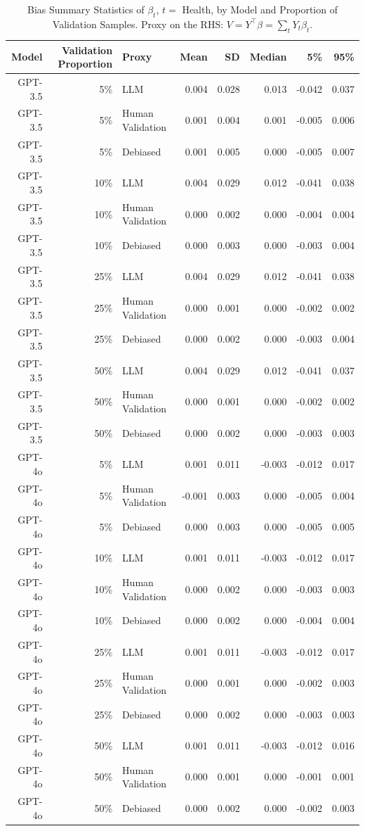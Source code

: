 \begin{table}

\caption{\label{tab:unnamed-chunk-1}Bias Summary Statistics of $\beta_{t}$, $t=$ Health, by Model and Proportion of Validation Samples.
      Proxy on the RHS: $V = Y^\top \beta = \sum_{t} Y_t \beta_t$.}
\centering
\begin{tabular}[t]{rrlrrrrr}
\toprule
Model & Validation Proportion & Proxy & Mean & SD & Median & 5\% & 95\%\\
\midrule
GPT-3.5 & 5\% & LLM & 0.004 & 0.028 & 0.013 & -0.042 & 0.037\\
GPT-3.5 & 5\% & Human Validation & 0.001 & 0.004 & 0.001 & -0.005 & 0.006\\
GPT-3.5 & 5\% & Debiased & 0.001 & 0.005 & 0.000 & -0.005 & 0.007\\
GPT-3.5 & 10\% & LLM & 0.004 & 0.029 & 0.012 & -0.041 & 0.038\\
GPT-3.5 & 10\% & Human Validation & 0.000 & 0.002 & 0.000 & -0.004 & 0.004\\
GPT-3.5 & 10\% & Debiased & 0.000 & 0.003 & 0.000 & -0.003 & 0.004\\
GPT-3.5 & 25\% & LLM & 0.004 & 0.029 & 0.012 & -0.041 & 0.038\\
GPT-3.5 & 25\% & Human Validation & 0.000 & 0.001 & 0.000 & -0.002 & 0.002\\
GPT-3.5 & 25\% & Debiased & 0.000 & 0.002 & 0.000 & -0.003 & 0.004\\
GPT-3.5 & 50\% & LLM & 0.004 & 0.029 & 0.012 & -0.041 & 0.037\\
GPT-3.5 & 50\% & Human Validation & 0.000 & 0.001 & 0.000 & -0.002 & 0.002\\
GPT-3.5 & 50\% & Debiased & 0.000 & 0.002 & 0.000 & -0.003 & 0.003\\
GPT-4o & 5\% & LLM & 0.001 & 0.011 & -0.003 & -0.012 & 0.017\\
GPT-4o & 5\% & Human Validation & -0.001 & 0.003 & 0.000 & -0.005 & 0.004\\
GPT-4o & 5\% & Debiased & 0.000 & 0.003 & 0.000 & -0.005 & 0.005\\
GPT-4o & 10\% & LLM & 0.001 & 0.011 & -0.003 & -0.012 & 0.017\\
GPT-4o & 10\% & Human Validation & 0.000 & 0.002 & 0.000 & -0.003 & 0.003\\
GPT-4o & 10\% & Debiased & 0.000 & 0.002 & 0.000 & -0.004 & 0.004\\
GPT-4o & 25\% & LLM & 0.001 & 0.011 & -0.003 & -0.012 & 0.017\\
GPT-4o & 25\% & Human Validation & 0.000 & 0.001 & 0.000 & -0.002 & 0.003\\
GPT-4o & 25\% & Debiased & 0.000 & 0.002 & 0.000 & -0.003 & 0.003\\
GPT-4o & 50\% & LLM & 0.001 & 0.011 & -0.003 & -0.012 & 0.016\\
GPT-4o & 50\% & Human Validation & 0.000 & 0.001 & 0.000 & -0.001 & 0.001\\
GPT-4o & 50\% & Debiased & 0.000 & 0.002 & 0.000 & -0.002 & 0.003\\
\bottomrule
\end{tabular}
\end{table}
